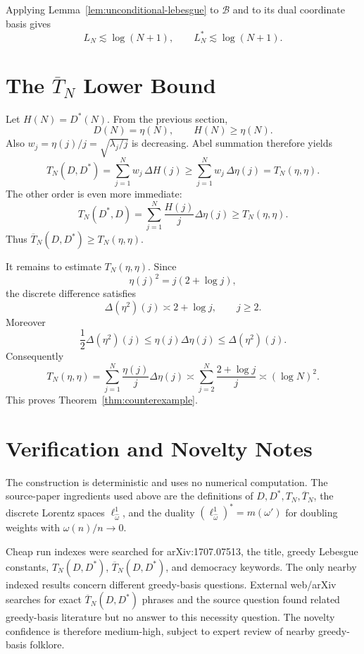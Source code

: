 \documentclass[11pt]{article}
\newcommand{\OT}{\overline T}
\begin{document}
Applying Lemma~\ref{lem:unconditional-lebesgue} to \(\mathcal B\) and to its
dual coordinate basis gives
\[
   L_N\lesssim \log(N+1),\qquad L_N^*\lesssim \log(N+1).
\]

\section{The \texorpdfstring{$\OT_N$}{OTN} Lower Bound}

Let \(H(N)=D^*(N)\).  From the previous section,
\[
   D(N)=\eta(N),\qquad H(N)\ge \eta(N).
\]
Also \(w_j=\eta(j)/j=\sqrt{\lambda_j/j}\) is decreasing.  Abel summation
therefore yields
\[
   T_N(D,D^*)=\sum_{j=1}^N w_j\,\Delta H(j)
      \ge \sum_{j=1}^N w_j\,\Delta\eta(j)
      =T_N(\eta,\eta).
\]
The other order is even more immediate:
\[
   T_N(D^*,D)=\sum_{j=1}^N \frac{H(j)}{j}\Delta\eta(j)
      \ge T_N(\eta,\eta).
\]
Thus \(\OT_N(D,D^*)\ge T_N(\eta,\eta)\).

It remains to estimate \(T_N(\eta,\eta)\).  Since
\[
   \eta(j)^2=j(2+\log j),
\]
the discrete difference satisfies
\[
   \Delta(\eta^2)(j)\asymp 2+\log j,\qquad j\ge 2.
\]
Moreover
\[
   \frac12\Delta(\eta^2)(j)
      \le \eta(j)\Delta\eta(j)
      \le \Delta(\eta^2)(j).
\]
Consequently
\[
   T_N(\eta,\eta)
      =\sum_{j=1}^N\frac{\eta(j)}{j}\Delta\eta(j)
      \asymp \sum_{j=2}^N\frac{2+\log j}{j}
      \asymp (\log N)^2.
\]
This proves Theorem~\ref{thm:counterexample}.

\section{Verification and Novelty Notes}

The construction is deterministic and uses no numerical computation.  The
source-paper ingredients used above are the definitions of \(D,D^*,T_N,\OT_N\),
the discrete Lorentz spaces \(\ell^1_{\widehat\omega}\), and the duality
\((\ell^1_{\widehat\omega})^*=m(\omega')\) for doubling weights with
\(\omega(n)/n\to0\).

Cheap run indexes were searched for arXiv:1707.07513, the title, greedy
Lebesgue constants, \(T_N(D,D^*)\), \(\OT_N(D,D^*)\), and democracy keywords.
The only nearby indexed results concern different greedy-basis questions.
External web/arXiv searches for exact \(\OT_N(D,D^*)\) phrases and the source
question found related greedy-basis literature but no answer to this necessity
question.  The novelty confidence is therefore medium-high, subject to expert
review of nearby greedy-basis folklore.
\end{document}
